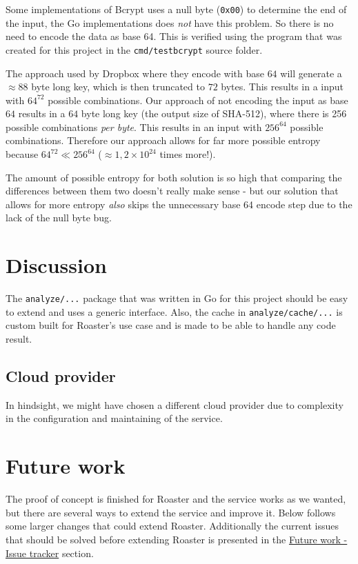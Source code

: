 \documentclass[12pt,a4paper]{report}
\begin{document}
Some implementations of Bcrypt uses a null byte (\texttt{0x00}) to determine the end
of the input\cite{bcrypt-bug}, the Go implementations does \textit{not} have this problem. So there
is no need to encode the data as base 64. This is verified using the program that was created for
this project in the \texttt{cmd/testbcrypt} source folder.

The approach used by Dropbox where they encode with base $64$ will generate a
$\approx 88$ byte long key, which is then truncated to $72$ bytes. This results in a
input with $64^{72}$ possible combinations. Our approach of not encoding the
input as base $64$ results in a $64$ byte long key (the output size of SHA-512),
where there is 256 possible combinations \textit{per byte}. This results in an input
with $256^{64}$ possible combinations. Therefore our approach allows for far more
possible entropy because $64^{72} \ll 256^{64}$ ($\approx 1,2 \times 10^{24}$ times more!).

The amount of possible entropy for both solution is so high that comparing the differences
between them two doesn't really make sense - but our solution that allows for more entropy
\textit{also} skips the unnecessary base 64 encode step due to the lack of the null byte bug.

\chapter{Discussion}
The \texttt{analyze/...} package that was written in Go for this project should be easy to extend and uses a generic interface. Also, the cache in \texttt{analyze/cache/...} is custom built for Roaster's use case and is made to be able to handle any code result.

\section{Cloud provider}
In hindsight, we might have chosen a different cloud provider due to complexity in the configuration and maintaining of the service. 

\chapter{Future work}
\label{sec:future-work}
The proof of concept is finished for Roaster and the service works as we wanted, but there are several ways to extend the service and improve it. Below follows some larger changes that could extend Roaster. Additionally the current issues that should be solved before extending Roaster is presented in the \hyperref[sec:issue-tracker]{Future work - Issue tracker} section.
\end{document}
